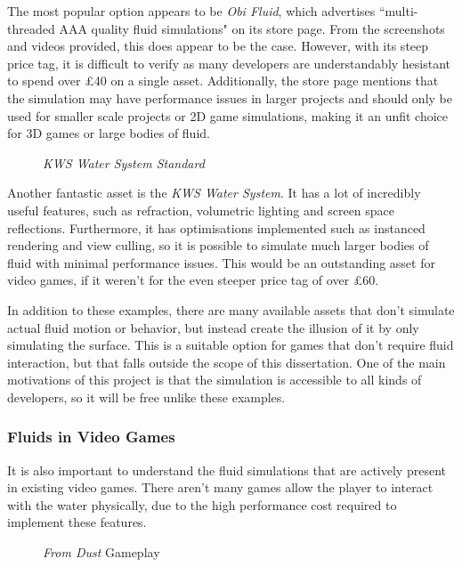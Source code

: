 \documentclass[12pt]{article}
\newcommand{\wideimage}[2][]{%
  \makebox[\textwidth][c]{\texttt{[image: \#2]}}%
}
\begin{document}
    The most popular option appears to be \textit{Obi Fluid}, which advertises ``multi-threaded AAA quality fluid simulations" on its store page. From the screenshots and videos provided, this does appear to be the case. However, with its steep price tag, it is difficult to verify as many developers are understandably hesistant to spend over £40 on a single asset. Additionally, the store page mentions that the simulation may have performance issues in larger projects and should only be used for smaller scale projects or 2D game simulations, making it an unfit choice for 3D games or large bodies of fluid.

    \begin{figure}[H]
        \noindent\wideimage[]{KWS.png}
        \caption{\textit{KWS Water System Standard} \cite{kws}}
    \end{figure}

    Another fantastic asset is the \textit{KWS Water System}. It has a lot of incredibly useful features, such as refraction, volumetric lighting and screen space reflections. Furthermore, it has optimisations implemented such as instanced rendering and view culling, so it is possible to simulate much larger bodies of fluid with minimal performance issues. This would be an outstanding asset for video games, if it weren't for the even steeper price tag of over £60.

    In addition to these examples, there are many available assets that don't simulate actual fluid motion or behavior, but instead create the illusion of it by only simulating the surface. This is a suitable option for games that don't require fluid interaction, but that falls outside the scope of this dissertation. One of the main motivations of this project is that the simulation is accessible to all kinds of developers, so it will be free unlike these examples.
    
    \subsubsection{Fluids in Video Games}

    It is also important to understand the fluid simulations that are actively present in existing video games. There aren't many games allow the player to interact with the water physically, due to the high performance cost required to implement these features.

    \begin{figure}[H]
        \noindent\wideimage[]{fromDust.png}
        \caption{\textit{From Dust} Gameplay \cite{fromdustvideo}}
    \end{figure}
\end{document}
